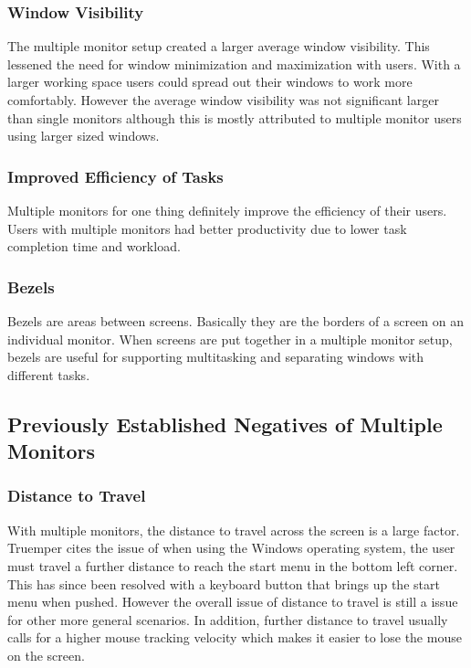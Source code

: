 \documentclass[a4paper]{article}
\begin{document}
\subsubsection{Window Visibility}
The multiple monitor setup created a larger average window visibility.\cite{Hutchings} This lessened the need for window minimization and maximization with users.\cite{Grudin} With a larger working space users could spread out their windows to work more comfortably.\cite{Truemper} However the average window visibility was not significant larger than single monitors although this is mostly attributed to multiple monitor users using larger sized windows.\cite{Hutchings}

\subsubsection{Improved Efficiency of Tasks}
Multiple monitors for one thing definitely improve the efficiency of their users. Users with multiple monitors had better productivity due to lower task completion time and workload.\cite{Kang}

\subsubsection{Bezels}
Bezels are areas between screens.\cite{Truemper} Basically they are the borders of a screen on an individual monitor. When screens are put together in a multiple monitor setup, bezels are useful for supporting multitasking and separating windows with different tasks.



\subsection{Previously Established Negatives of Multiple Monitors}

\subsubsection{Distance to Travel}
With multiple monitors, the distance to travel across the screen is a large factor. Truemper cites the issue of when using the Windows operating system, the user must travel a further distance to reach the start menu in the bottom left corner.\cite{Truemper} This has since been resolved with a keyboard button that brings up the start menu when pushed. However the overall issue of distance to travel is still a issue for other more general scenarios.\cite{Truemper} In addition, further distance to travel usually calls for a higher mouse tracking velocity which makes it easier to lose the mouse on the screen. \cite{Truemper}
\end{document}
